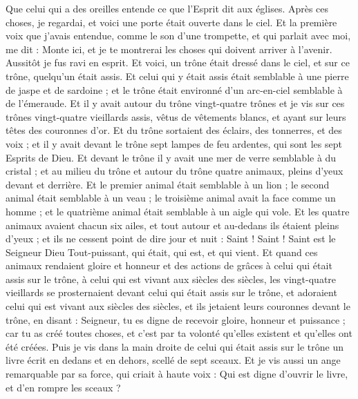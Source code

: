 \begin{multicols}{2}
Que celui qui a des oreilles entende ce que l'Esprit dit aux églises.
\VerseOne{}Après ces choses, je regardai, et voici une porte était ouverte dans le ciel. Et la première voix que j'avais entendue, comme le son d'une trompette, et qui parlait avec moi, me dit : Monte ici, et je te montrerai les choses qui doivent arriver à l'avenir.
Aussitôt je fus ravi en esprit. Et voici, un trône était dressé dans le ciel, et sur ce trône, quelqu'un était assis.
Et celui qui y était assis était semblable à une pierre de jaspe et de sardoine ; et le trône était environné d'un arc-en-ciel semblable à de l'émeraude.
Et il y avait autour du trône vingt-quatre trônes et je vis sur ces trônes vingt-quatre vieillards assis, vêtus de vêtements blancs, et ayant sur leurs têtes des couronnes d'or.
Et du trône sortaient des éclairs, des tonnerres, et des voix ; et il y avait devant le trône sept lampes de feu ardentes, qui sont les sept Esprits de Dieu.
Et devant le trône il y avait une mer de verre semblable à du cristal ; et au milieu du trône et autour du trône quatre animaux, pleins d'yeux devant et derrière.
Et le premier animal était semblable à un lion ; le second animal était semblable à un veau ; le troisième animal avait la face comme un homme ; et le quatrième animal était semblable à un aigle qui vole.
Et les quatre animaux avaient chacun six ailes, et tout autour et au-dedans ils étaient pleins d'yeux ; et ils ne cessent point de dire jour et nuit : Saint ! Saint ! Saint est le Seigneur Dieu Tout-puissant, qui était, qui est, et qui vient.
Et quand ces animaux rendaient gloire et honneur et des actions de grâces à celui qui était assis sur le trône, à celui qui est vivant aux siècles des siècles,
les vingt-quatre vieillards se prosternaient devant celui qui était assis sur le trône, et adoraient celui qui est vivant aux siècles des siècles, et ils jetaient leurs couronnes devant le trône, en disant :
Seigneur, tu es digne de recevoir gloire, honneur et puissance ; car tu as créé toutes choses, et c'est par ta volonté qu'elles existent et qu'elles ont été créées.
\VerseOne{}Puis je vis dans la main droite de celui qui était assis sur le trône un livre écrit en dedans et en dehors, scellé de sept sceaux.
Et je vis aussi un ange remarquable par sa force, qui criait à haute voix : Qui est digne d'ouvrir le livre, et d'en rompre les sceaux ?

\end{multicols}
